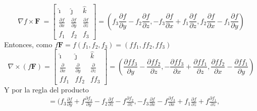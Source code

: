 \documentclass{article}
\begin{document}
\begin{enumerate}
{\begin{enumerate}
{                    \[\nabla f \times \mathbf{F}\ =
                    \begin{bmatrix}
                        \hat{\imath} & \hat{\jmath} & \hat{k} \\
                        \frac{\partial f}{\partial x} &
                        \frac{\partial f}{\partial y}
                         & \frac{\partial f}{\partial z} \\
                         f_1 & f_2 & f_3
                    \end{bmatrix} =
                    (
                    f_3\frac{\partial f}{\partial y}
                    -f_2\frac{\partial f}{\partial z},
                    -f_3\frac{\partial f}{\partial x}
                    +f_1\frac{\partial f}{\partial z},
                    f_2\frac{\partial f}{\partial x}
                    -f_1\frac{\partial f}{\partial y}
                    )
                    \]
                    Entonces, como $f\mathbf{F} = f(f_1, f_2, f_3) =
                    (ff_1, ff_2, ff_3)$
                    \[
                    \nabla \times (f \mathbf{F}) =
                    \begin{bmatrix}
                        \hat{\imath} & \hat{\jmath} & \hat{k} \\
                        \frac{\partial}{\partial x} & \frac{\partial}{\partial y}
                         & \frac{\partial}{\partial z} \\
                         ff_1 & ff_2 & ff_3
                    \end{bmatrix} =
                    (
                    \frac{\partial ff_3}{\partial y}
                    - \frac{\partial ff_2}{\partial z},
                    -\frac{\partial ff_3}{\partial x}
                    +\frac{\partial ff_1}{\partial z},
                    \frac{\partial ff_2}{\partial x}
                    -\frac{\partial ff_1}{\partial y}
                    )
                    \]
                    Y por la regla del producto
                    \begin{align*}
                        &=
                        (
                        f_3\frac{\partial f}{\partial y}
                        +f\frac{\partial f_3}{\partial y}
                        -f_2\frac{\partial f}{\partial z}
                        -f\frac{\partial f_2}{\partial z},
                        -f_3\frac{\partial f}{\partial x}
                        -f\frac{\partial f_3}{\partial x}
                        +f_1\frac{\partial f}{\partial z}
                        +f\frac{\partial f_1}{\partial z},

\end{align*}}
\end{enumerate}}
\end{enumerate}
\end{document}
